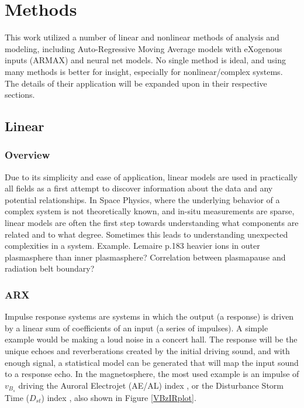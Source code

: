 \chapter[Models]{Methods}

This work utilized a number of linear and nonlinear methods of analysis and modeling, including Auto-Regressive Moving Average models with eXogenous inputs (ARMAX) and neural net models. No single method is ideal, and using many methods is better for insight, especially for nonlinear/complex systems. The details of their application will be expanded upon in their respective sections.

\section{Linear}

\subsection{Overview}
Due to its simplicity and ease of application, linear models are used in practically all fields as a first attempt to discover information about the data and any potential relationships. In Space Physics, where the underlying behavior of a complex system is not theoretically known, and in-situ measurements are sparse, linear models are often the first step towards understanding what components are related and to what degree. Sometimes this leads to understanding unexpected complexities in a system.
\vnote Example. Lemaire p.183 heavier ions in outer plasmasphere than inner plasmasphere? Correlation between plasmapause and radiation belt boundary?

\subsection{ARX}

Impulse response systems are systems in which the output (a response) is driven by a linear sum of coefficients of an input (a series of impulses). A simple example would be making a loud noise in a concert hall. The response will be the unique echoes and reverberations created by the initial driving sound, and with enough signal, a statistical model can be generated that will map the input sound to a response echo. In the magnetosphere, the most used example is an impulse of $v_{B_s}$ driving the Auroral Electrojet (AE/AL) index \citep{VBzAL}, or the Disturbance Storm Time ($D_{st}$) index \citep{VBzDST}, also shown in Figure \ref{VBzIRplot}.

